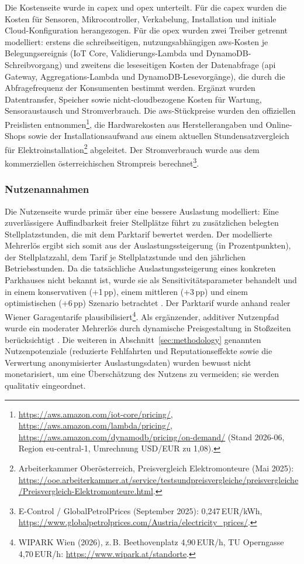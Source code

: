 Die Kostenseite wurde in \ac{capex} und \ac{opex} unterteilt. Für die \ac{capex} wurden die Kosten für Sensoren, Mikrocontroller, Verkabelung, Installation und initiale Cloud-Konfiguration herangezogen. Für die \ac{opex} wurden zwei Treiber getrennt modelliert: erstens die schreibseitigen, nutzungsabhängigen \ac{aws}-Kosten je Belegungsereignis (IoT Core, Validierungs-Lambda und DynamoDB-Schreibvorgang) und zweitens die leseseitigen Kosten der Datenabfrage (\ac{api} Gateway, Aggregations-Lambda und DynamoDB-Lesevorgänge), die durch die Abfragefrequenz der Konsumenten bestimmt werden. Ergänzt wurden Datentransfer, Speicher sowie nicht-cloudbezogene Kosten für Wartung, Sensoraustausch und Stromverbrauch. Die \ac{aws}-Stückpreise wurden den offiziellen Preislisten entnommen\footnote{\url{https://aws.amazon.com/iot-core/pricing/}, \url{https://aws.amazon.com/lambda/pricing/}, \url{https://aws.amazon.com/dynamodb/pricing/on-demand/} (Stand 2026-06, Region eu-central-1, Umrechnung USD/EUR zu 1{,}08).}, die Hardwarekosten aus Herstellerangaben und Online-Shops sowie der Installationsaufwand aus einem aktuellen Stundensatzvergleich für Elektroinstallation\footnote{Arbeiterkammer Oberösterreich, Preisvergleich Elektromonteure (Mai 2025): \url{https://ooe.arbeiterkammer.at/service/testsundpreisvergleiche/preisvergleiche/Preisvergleich-Elektromonteure.html}.} abgeleitet. Der Stromverbrauch wurde aus dem kommerziellen österreichischen Strompreis berechnet\footnote{E-Control / GlobalPetrolPrices (September 2025): 0{,}247\,EUR/kWh, \url{https://www.globalpetrolprices.com/Austria/electricity_prices/}.}.

\subsubsection{Nutzenannahmen}

Die Nutzenseite wurde primär über eine bessere Auslastung modelliert: Eine zuverlässigere Auffindbarkeit freier Stellplätze führt zu zusätzlichen belegten Stellplatzstunden, die mit dem Parktarif bewertet werden. Der modellierte Mehrerlös ergibt sich somit aus der Auslastungssteigerung (in Prozentpunkten), der Stellplatzzahl, dem Tarif je Stellplatzstunde und den jährlichen Betriebsstunden. Da die tatsächliche Auslastungssteigerung eines konkreten Parkhauses nicht bekannt ist, wurde sie als Sensitivitätsparameter behandelt und in einem konservativen (+1\,pp), einem mittleren (+3\,pp) und einem optimistischen (+6\,pp) Szenario betrachtet \citep{wangEconomicsSmartParking2025,sarkerSmartParkingSystem2020}. Der Parktarif wurde anhand realer Wiener Garagentarife plausibilisiert\footnote{WIPARK Wien (2026), z.\,B. Beethovenplatz 4{,}90\,EUR/h, TU Operngasse 4{,}70\,EUR/h: \url{https://www.wipark.at/standorte}.}. Als ergänzender, additiver Nutzenpfad wurde ein moderater Mehrerlös durch dynamische Preisgestaltung in Stoßzeiten berücksichtigt \citep{hassineDynamicPricingRoute2024}. Die weiteren in Abschnitt~\ref{sec:methodology} genannten Nutzenpotenziale (reduzierte Fehlfahrten und Reputationseffekte sowie die Verwertung anonymisierter Auslastungsdaten) wurden bewusst nicht monetarisiert, um eine Überschätzung des Nutzens zu vermeiden; sie werden qualitativ eingeordnet.

